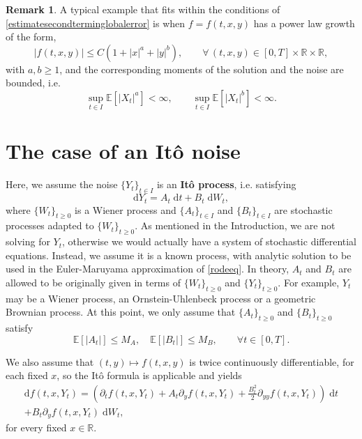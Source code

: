 \documentclass[reqno,12pt]{amsart}
\theoremstyle{plain}%
\theoremstyle{definition}
\newtheorem{rmk}{Remark}[section]
\begin{document}
\begin{rmk}
    A typical example that fits within the conditions of \cref{estimatesecondterminglobalerror} is when $f=f(t, x, y)$ has a power law growth of the form,
    \[
      |f(t, x, y)| \leq C(1 + |x|^a + |y|^b), \qquad \forall\,(t, x, y) \in [0, T] \times \mathbb{R}\times\mathbb{R},
    \]
    with $a, b \geq 1$, and the corresponding moments of the solution and the noise are bounded, i.e.
    \[
      \sup_{t\in I}\mathbb{E}[|X_t|^a]  < \infty, \qquad \sup_{t\in I}\mathbb{E}[|X_t|^b] < \infty.
    \]
\end{rmk}

\section{The case of an It\^o noise}

Here, we assume the noise $\{Y_t\}_{t\in I}$ is an \textbf{It\^o process}, i.e. satisfying
\begin{equation}
  \label{itoprocess}
  \mathrm{d}Y_t = A_t \;\mathrm{d}t + B_t \;\mathrm{d}W_t,
\end{equation}
where $\{W_t\}_{t\geq 0}$ is a Wiener process and $\{A_t\}_{t \in I}$ and $\{B_t\}_{t \in I}$ are stochastic processes adapted to $\{W_t\}_{t\geq 0}$. As mentioned in the Introduction, we are not solving for $Y_t$, otherwise we would actually have a system of stochastic differential equations. Instead, we assume it is a known process, with analytic solution to be used in the Euler-Maruyama approximation of \eqref{rodeeq}. In theory, $A_t$ and $B_t$ are allowed to be originally given in terms of $\{W_t\}_{t\geq 0}$ and $\{Y_t\}_{t\geq 0}$. For example, $Y_t$ may be a Wiener process, an Ornstein-Uhlenbeck process or a geometric Brownian process. At this point, we only assume that $\{A_t\}_{t \geq 0}$ and $\{B_t\}_{t \geq 0}$ satisfy
\begin{equation}
    \label{EAtEBtbound}
    \mathbb{E}[|A_t|] \leq M_A, \quad \mathbb{E}[|B_t|] \leq M_B, \qquad \forall t \in [0, T].
\end{equation}

We also assume that $(t, y) \mapsto f(t, x, y)$ is twice continuously differentiable, for each fixed $x$, so the It\^o formula is applicable and yields
\begin{multline}
  \label{itoformula}
  \mathrm{d}f(t, x, Y_t) = \left(\partial_t f(t, x, Y_t) + A_t \partial_y f(t, x, Y_t)  + \frac{B_t^2}{2}\partial_{yy}f(t, x, Y_t) \right) \;\mathrm{d}t \\ + B_t \partial_y f(t, x, Y_t)\;\mathrm{d}W_t,
\end{multline}
for every fixed $x\in \mathbb{R}$.
\end{document}

